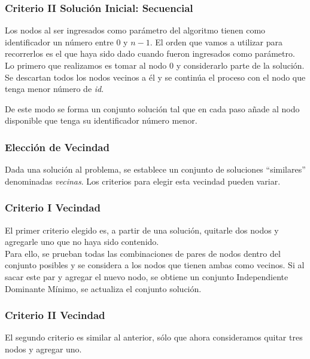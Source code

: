 \subsubsection*{Criterio II Solución Inicial: Secuencial}

Los nodos al ser ingresados como parámetro del algoritmo tienen como identificador un número entre $0$ y $n-1$. El orden que vamos a utilizar para recorrerlos es el que haya sido dado cuando fueron ingresados como parámetro.\\

Lo primero que realizamos es tomar al nodo $0$ y considerarlo parte de la solución. Se descartan todos los nodos vecinos a él y se continúa el proceso con el nodo que tenga menor número de \textit{id}.

De este modo se forma un conjunto solución tal que en cada paso añade al nodo disponible que tenga su identificador número menor.

\subsubsection{Elección de Vecindad}

Dada una soluci\'on al problema, se establece un conjunto de soluciones ``similares'' denominadas \emph{vecinas}. Los criterios para elegir esta vecindad pueden variar.

\subsubsection*{Criterio I Vecindad}

El primer criterio elegido es, a partir de una soluci\'on, quitarle dos nodos y agregarle uno que no haya sido contenido.\\

Para ello, se prueban todas las combinaciones de pares de nodos dentro del conjunto posibles y se considera a los nodos que tienen ambas como vecinos. Si al sacar este par y agregar el nuevo nodo, se obtiene un conjunto Independiente Dominante M\'inimo, se actualiza el conjunto soluci\'on. 

\subsubsection*{Criterio II Vecindad}

El segundo criterio es similar al anterior, s\'olo que ahora consideramos quitar tres nodos y agregar uno.\\

